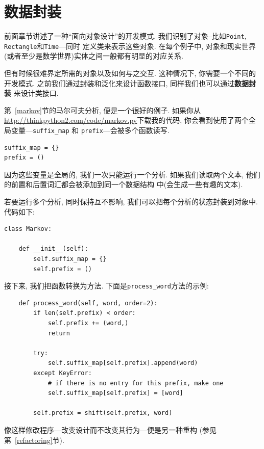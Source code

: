 \documentclass[10pt]{book}
\begin{document}
\section{数据封装}

前面章节讲述了一种``面向对象设计''的开发模式. 
我们识别了对象--比如{\tt Point}, {\tt Rectangle}和{\tt Time}---同时
定义类来表示这些对象. 
在每个例子中, 对象和现实世界(或者至少是数学世界)实体之间一般都有明显的对应关系. 

但有时候很难界定所需的对象以及如何与之交互. 
这种情况下, 你需要一个不同的开发模式. 
之前我们通过封装和泛化来设计函数接口, 同样我们也可以通过{\bf 数据封装}
来设计类接口. 

第~\ref{markov}节的马尔可夫分析, 便是一个很好的例子. 
如果你从\url{http://thinkpython2.com/code/markov.py}下载我的代码, 
你会看到使用了两个全局变量---\verb"suffix_map" 和
\verb"prefix"---会被多个函数读写. 

\begin{verbatim}
suffix_map = {}        
prefix = ()            
\end{verbatim}

因为这些变量是全局的, 我们一次只能运行一个分析. 
如果我们读取两个文本, 他们的前置和后置词汇都会被添加到同一个数据结构
中(会生成一些有趣的文本). 

若要运行多个分析, 同时保持互不影响, 我们可以把每个分析的状态封装到对象中. 
代码如下:

\begin{verbatim}
class Markov:

    def __init__(self):
        self.suffix_map = {}
        self.prefix = ()    
\end{verbatim}

接下来, 我们把函数转换为方法. 
下面是\verb"process_word"方法的示例:

\begin{verbatim}
    def process_word(self, word, order=2):
        if len(self.prefix) < order:
            self.prefix += (word,)
            return

        try:
            self.suffix_map[self.prefix].append(word)
        except KeyError:
            # if there is no entry for this prefix, make one
            self.suffix_map[self.prefix] = [word]

        self.prefix = shift(self.prefix, word)        
\end{verbatim}
像这样修改程序---改变设计而不改变其行为---便是另一种重构
(参见第~\ref{refactoring}节).
\end{document}
